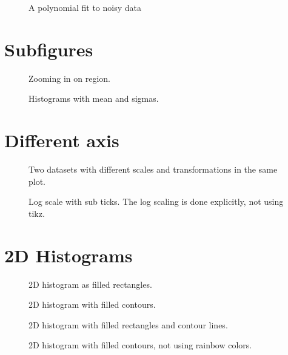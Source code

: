 \documentclass{article}
\begin{document}
\begin{figure}[H]
  \centering
  
  \caption{A polynomial fit to noisy data}
\end{figure}

\section{Subfigures}
\label{sec:subfig}

\begin{figure}[H]
  \centering
  
  \caption{ Zooming in on region. }
\end{figure}

\begin{figure}[H]
  \centering
  
  \caption{ Histograms with mean and sigmas.}
\end{figure}

\section{Different axis}
\label{sec:axis}

\begin{figure}[H]
  \centering
  
  \caption{ Two datasets with different scales and transformations in the same plot.}
\end{figure}

\begin{figure}[H]
  \centering
  
  \caption{ Log scale with sub ticks. The log scaling is done explicitly, not using tikz.}
\end{figure}

\section{2D Histograms}
\label{sec:2dhisto}

\begin{figure}[H]
  \centering
  
  \caption{ 2D histogram as filled rectangles.}
\end{figure}

\begin{figure}[H]
  \centering
  
  \caption{ 2D histogram with filled contours.}
\end{figure}

\begin{figure}[H]
  \centering
  
  \caption{ 2D histogram  with filled rectangles and contour lines.}
\end{figure}

\begin{figure}[H]
  \centering
  
  \caption{ 2D histogram with filled contours, not using rainbow colors.}
\end{figure}
\end{document}

